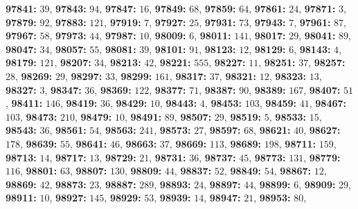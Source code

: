\textsf{\bfseries 97841:} $39$, \textsf{\bfseries 97843:} $94$, \textsf{\bfseries 97847:} $16$, \textsf{\bfseries 97849:} $68$, \textsf{\bfseries 97859:} $64$, \textsf{\bfseries 97861:} $24$, \textsf{\bfseries 97871:} $3$, \textsf{\bfseries 97879:} $92$, \textsf{\bfseries 97883:} $121$, \textsf{\bfseries 97919:} $7$, \textsf{\bfseries 97927:} $25$, \textsf{\bfseries 97931:} $73$, \textsf{\bfseries 97943:} $7$, \textsf{\bfseries 97961:} $87$, \textsf{\bfseries 97967:} $58$, \textsf{\bfseries 97973:} $44$, \textsf{\bfseries 97987:} $10$, \textsf{\bfseries 98009:} $6$, \textsf{\bfseries 98011:} $141$, \textsf{\bfseries 98017:} $29$, \textsf{\bfseries 98041:} $89$, \textsf{\bfseries 98047:} $34$, \textsf{\bfseries 98057:} $55$, \textsf{\bfseries 98081:} $39$, \textsf{\bfseries 98101:} $91$, \textsf{\bfseries 98123:} $12$, \textsf{\bfseries 98129:} $6$, \textsf{\bfseries 98143:} $4$, \textsf{\bfseries 98179:} $121$, \textsf{\bfseries 98207:} $34$, \textsf{\bfseries 98213:} $42$, \textsf{\bfseries 98221:} $555$, \textsf{\bfseries 98227:} $11$, \textsf{\bfseries 98251:} $37$, \textsf{\bfseries 98257:} $28$, \textsf{\bfseries 98269:} $29$, \textsf{\bfseries 98297:} $33$, \textsf{\bfseries 98299:} $161$, \textsf{\bfseries 98317:} $37$, \textsf{\bfseries 98321:} $12$, \textsf{\bfseries 98323:} $13$, \textsf{\bfseries 98327:} $3$, \textsf{\bfseries 98347:} $36$, \textsf{\bfseries 98369:} $122$, \textsf{\bfseries 98377:} $71$, \textsf{\bfseries 98387:} $90$, \textsf{\bfseries 98389:} $167$, \textsf{\bfseries 98407:} $51$, \textsf{\bfseries 98411:} $146$, \textsf{\bfseries 98419:} $36$, \textsf{\bfseries 98429:} $10$, \textsf{\bfseries 98443:} $4$, \textsf{\bfseries 98453:} $103$, \textsf{\bfseries 98459:} $41$, \textsf{\bfseries 98467:} $103$, \textsf{\bfseries 98473:} $210$, \textsf{\bfseries 98479:} $10$, \textsf{\bfseries 98491:} $89$, \textsf{\bfseries 98507:} $29$, \textsf{\bfseries 98519:} $5$, \textsf{\bfseries 98533:} $15$, \textsf{\bfseries 98543:} $36$, \textsf{\bfseries 98561:} $54$, \textsf{\bfseries 98563:} $241$, \textsf{\bfseries 98573:} $27$, \textsf{\bfseries 98597:} $68$, \textsf{\bfseries 98621:} $40$, \textsf{\bfseries 98627:} $178$, \textsf{\bfseries 98639:} $55$, \textsf{\bfseries 98641:} $46$, \textsf{\bfseries 98663:} $37$, \textsf{\bfseries 98669:} $113$, \textsf{\bfseries 98689:} $198$, \textsf{\bfseries 98711:} $159$, \textsf{\bfseries 98713:} $14$, \textsf{\bfseries 98717:} $13$, \textsf{\bfseries 98729:} $21$, \textsf{\bfseries 98731:} $36$, \textsf{\bfseries 98737:} $45$, \textsf{\bfseries 98773:} $131$, \textsf{\bfseries 98779:} $116$, \textsf{\bfseries 98801:} $63$, \textsf{\bfseries 98807:} $130$, \textsf{\bfseries 98809:} $44$, \textsf{\bfseries 98837:} $52$, \textsf{\bfseries 98849:} $54$, \textsf{\bfseries 98867:} $12$, \textsf{\bfseries 98869:} $42$, \textsf{\bfseries 98873:} $23$, \textsf{\bfseries 98887:} $289$, \textsf{\bfseries 98893:} $24$, \textsf{\bfseries 98897:} $44$, \textsf{\bfseries 98899:} $6$, \textsf{\bfseries 98909:} $29$, \textsf{\bfseries 98911:} $10$, \textsf{\bfseries 98927:} $145$, \textsf{\bfseries 98929:} $53$, \textsf{\bfseries 98939:} $14$, \textsf{\bfseries 98947:} $21$, \textsf{\bfseries 98953:} $80$, 

